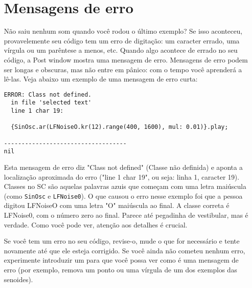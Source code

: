 \section{Mensagens de erro}

Não saiu nenhum som quando você rodou o último exemplo? Se isso aconteceu, provavelemente seu código tem um erro de digitação: um caracter errado, uma vírgula ou um parêntese a menos, etc. Quando algo acontece de errado no seu código, a Post window mostra uma mensagem de erro. Mensagens de erro podem ser longas e obscuras, mas não entre em pânico: com o tempo você aprenderá a lê-las. Veja abaixo um exemplo de uma mensagem de erro curta:

\begin{verbatim}
ERROR: Class not defined.
  in file 'selected text'
  line 1 char 19:

  {SinOsc.ar(LFNoiseO.kr(12).range(400, 1600), mul: 0.01)}.play; 
                     
-----------------------------------
nil
\end{verbatim}

Esta mensagem de erro diz "Class not defined" (Classe não definida) e aponta a localização aproximada do erro ("line 1 char 19", ou seja: linha 1, caracter 19). Classes no SC são aquelas palavras azuis que começam com uma letra maiúscula (como \texttt{SinOsc} e \texttt{LFNoise0}). O que causou o erro nesse exemplo foi que a pessoa digitou LFNoiseO com uma letra "O" maiúscula ao final. A classe correta é LFNoise0, com o número zero ao final. Parece até pegadinha de vestibular, mas é verdade. Como você pode ver, atenção aos detalhes é crucial.

Se você tem um erro no seu código, revise-o, mude o que for necessário e tente novamente até que ele esteja corrigido. Se você ainda não cometeu nenhum erro, experimente introduzir um para que você possa ver como é uma mensagem de erro (por exemplo, remova um ponto ou uma vírgula de um dos exemplos das senoides).

\bigskip
{}
